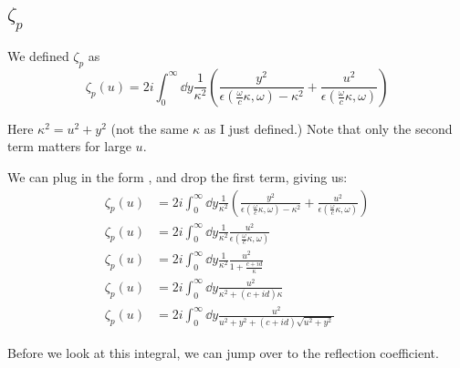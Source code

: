 \documentclass[../main.tex]{subfiles}
\begin{document}
	\subsection{\texorpdfstring{$\zeta_p$}{zp}} \label{subsec:zetap}

	We defined $\zeta_p$ as
	\begin{equation}
		\zeta_p(u) = 2i \int_0^\infty \dd{y} \frac{1}{\kappa^2} \left( \frac{y^2}{\epsilon(\frac{\omega}{c}\kappa, \omega) - \kappa^2} + \frac{u^2}{\epsilon(\frac{\omega}{c}\kappa, \omega)} \right)
	\end{equation}

	Here $\kappa^2 = u^2 + y^2$ (not the same $\kappa$ as I just defined.)
	Note that only the second term matters for large $u$.

	We can plug in the form , and drop the first term, giving us:
	\begin{align}
		\zeta_p(u) &= 2i \int_0^\infty \dd{y} \frac{1}{\kappa^2} \left( \frac{y^2}{\epsilon(\frac{\omega}{c}\kappa, \omega) - \kappa^2} + \frac{u^2}{\epsilon(\frac{\omega}{c}\kappa, \omega)} \right) \\
		\zeta_p(u) &= 2i \int_0^\infty \dd{y} \frac{1}{\kappa^2} \frac{u^2}{\epsilon(\frac{\omega}{c}\kappa, \omega)} \\
		\zeta_p(u) &= 2i \int_0^\infty \dd{y} \frac{1}{\kappa^2} \frac{u^2}{1 + \frac{c + i d}{\kappa}} \\
		\zeta_p(u) &= 2i \int_0^\infty \dd{y} \frac{u^2}{\kappa^2 + (c + id)\kappa} \\
		\zeta_p(u) &= 2i \int_0^\infty \dd{y} \frac{u^2}{u^2 + y^2 + (c + id)\sqrt{u^2 + y^2}} \label{eq:zetaPreZ}
	\end{align}

	Before we look at this integral, we can jump over to the reflection coefficient.
\end{document}
